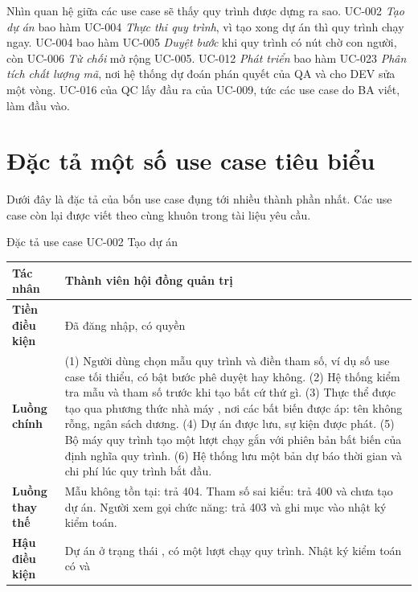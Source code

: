Nhìn quan hệ giữa các use case sẽ thấy quy trình được dựng ra sao. UC-002 \textit{Tạo dự án} bao hàm UC-004 \textit{Thực thi quy trình}, vì tạo xong dự án thì quy trình chạy ngay. UC-004 bao hàm UC-005 \textit{Duyệt bước} khi quy trình có nút chờ con người, còn UC-006 \textit{Từ chối} mở rộng UC-005. UC-012 \textit{Phát triển} bao hàm UC-023 \textit{Phân tích chất lượng mã}, nơi hệ thống dự đoán phán quyết của QA và cho DEV sửa một vòng. UC-016 của QC lấy đầu ra của UC-009, tức các use case do BA viết, làm đầu vào.

\section{Đặc tả một số use case tiêu biểu}

Dưới đây là đặc tả của bốn use case đụng tới nhiều thành phần nhất. Các use case còn lại được viết theo cùng khuôn trong tài liệu yêu cầu.

\begin{table}{Đặc tả use case UC-002 Tạo dự án}
\label{tab:uc002}
\small
\begin{tabularx}{\textwidth}{|P{2.8cm}|L|}
\hline
\textbf{Tác nhân} & Thành viên hội đồng quản trị \\ \hline
\textbf{Tiền điều kiện} & Đã đăng nhập, có quyền  \\ \hline
\textbf{Luồng chính} &
(1) Người dùng chọn mẫu quy trình và điền tham số, ví dụ số use case tối thiểu, có bật bước phê duyệt hay không.
(2) Hệ thống kiểm tra mẫu và tham số trước khi tạo bất cứ thứ gì.
(3) Thực thể  được tạo qua phương thức nhà máy , nơi các bất biến được áp: tên không rỗng, ngân sách dương.
(4) Dự án được lưu, sự kiện  được phát.
(5) Bộ máy quy trình tạo một lượt chạy gắn với phiên bản bất biến  của định nghĩa quy trình.
(6) Hệ thống lưu một bản dự báo thời gian và chi phí lúc quy trình bắt đầu. \\ \hline
\textbf{Luồng thay thế} & Mẫu không tồn tại: trả 404. Tham số sai kiểu: trả 400 và chưa tạo dự án. Người xem gọi chức năng: trả 403 và ghi mục  vào nhật ký kiểm toán. \\ \hline
\textbf{Hậu điều kiện} & Dự án ở trạng thái , có một lượt chạy quy trình. Nhật ký kiểm toán có  và  \\ \hline
\end{tabularx}
\end{table}

